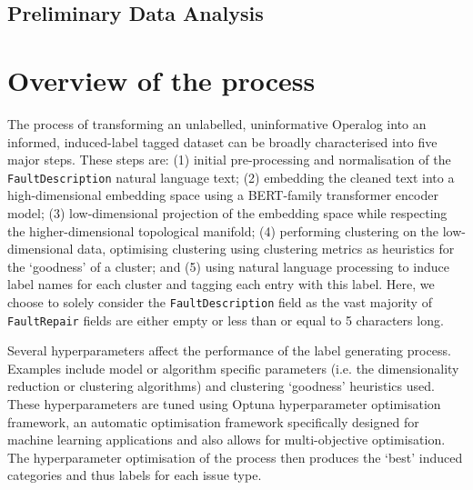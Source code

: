 \documentclass[10pt,oneside]{report}
\begin{document}
\subsection{Preliminary Data Analysis}


\section{Overview of the process}

The process of transforming an unlabelled, uninformative Operalog into an informed, induced-label tagged dataset can be broadly characterised into five major steps. These steps are: (1) initial pre-processing and normalisation of the \texttt{FaultDescription} natural language text; (2) embedding the cleaned text into a high-dimensional embedding space using a BERT-family transformer encoder model; (3) low-dimensional projection of the embedding space while respecting the higher-dimensional topological manifold; (4) performing clustering on the low-dimensional data, optimising clustering using clustering metrics as heuristics for the `goodness' of a cluster; and (5) using natural language processing to induce label names for each cluster and tagging each entry with this label. Here, we choose to solely consider the \texttt{FaultDescription} field as the vast majority of \texttt{FaultRepair} fields are either empty or less than or equal to 5 characters long.

Several hyperparameters affect the performance of the label generating process. Examples include model or algorithm specific parameters (i.e. the dimensionality reduction or clustering algorithms) and clustering `goodness' heuristics used. These hyperparameters are tuned using Optuna hyperparameter optimisation framework, an automatic optimisation framework specifically designed for machine learning applications \cite{akiba2019optuna} and also allows for multi-objective optimisation. The hyperparameter optimisation of the process then produces the `best' induced categories and thus labels for each issue type. 
\end{document}
